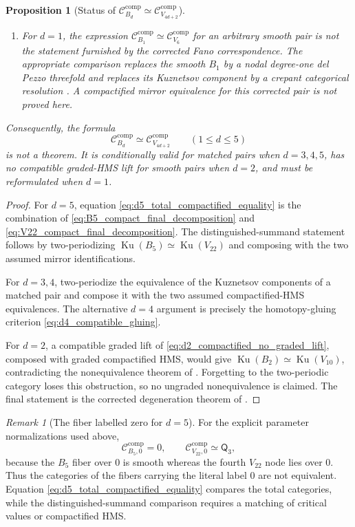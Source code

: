 \documentclass[11pt]{amsart}
\newtheorem{proposition}[theorem]{Proposition}
\theoremstyle{definition}
\theoremstyle{remark}
\newtheorem{remark}[theorem]{Remark}
\newcommand{\MorseCat}[1]{\mathsf{Q}_{#1}}
\begin{document}
\begin{proposition}[Status of
$\mathcal C_{B_d}^{\mathrm{comp}}\simeq
\mathcal C_{V_{4d+2}}^{\mathrm{comp}}$]
\begin{enumerate}[label=\textup{(\roman*)}]
\item For $d=1$, the expression
$\mathcal C_{B_1}^{\mathrm{comp}}\simeq
\mathcal C_{V_6}^{\mathrm{comp}}$ for an arbitrary smooth pair is not the
statement furnished by the corrected Fano correspondence.  The appropriate
comparison replaces the smooth $B_1$ by a nodal degree-one del Pezzo
threefold and replaces its Kuznetsov component by a crepant categorical
resolution \cite{KuzShinder}.  A compactified mirror equivalence for this
corrected pair is not proved here.
\end{enumerate}
Consequently, the formula
\[
\mathcal C_{B_d}^{\mathrm{comp}}
\simeq
\mathcal C_{V_{4d+2}}^{\mathrm{comp}}
\qquad(1\leq d\leq5)
\]
is not a theorem.  It is conditionally valid for matched pairs when
$d=3,4,5$, has no compatible graded-HMS lift for smooth pairs when $d=2$,
and must be reformulated when $d=1$.
\end{proposition}

\begin{proof}
For $d=5$, equation \eqref{eq:d5_total_compactified_equality} is the
combination of \eqref{eq:B5_compact_final_decomposition} and
\eqref{eq:V22_compact_final_decomposition}.  The distinguished-summand
statement follows by two-periodizing
$\operatorname{Ku}(B_5)\simeq\operatorname{Ku}(V_{22})$ and composing with
the two assumed mirror identifications.

For $d=3,4$, two-periodize the equivalence of the Kuznetsov components of a
matched pair and compose it with the two assumed compactified-HMS
equivalences.  The alternative $d=4$ argument is precisely the homotopy-gluing
criterion \eqref{eq:d4_compatible_gluing}.

For $d=2$, a compatible graded lift of
\eqref{eq:d2_compactified_no_graded_lift}, composed with graded compactified
HMS, would give
$\operatorname{Ku}(B_2)\simeq\operatorname{Ku}(V_{10})$, contradicting the
nonequivalence theorem of \cite{BayerPerry}.  Forgetting to the two-periodic
category loses this obstruction, so no ungraded nonequivalence is claimed.
The final statement is the corrected degeneration theorem of
\cite{KuzShinder}.
\end{proof}

\begin{remark}[The fiber labelled zero for $d=5$]
\label{rem:d5_zero_fiber_warning}
For the explicit parameter normalizations used above,
\[
\mathcal C_{B_5,0}^{\mathrm{comp}}=0,
\qquad
\mathcal C_{V_{22},0}^{\mathrm{comp}}\simeq\MorseCat{3},
\]
because the $B_5$ fiber over $0$ is smooth whereas the fourth $V_{22}$ node
lies over $0$.  Thus the categories of the fibers carrying the literal label
$0$ are not equivalent.  Equation \eqref{eq:d5_total_compactified_equality}
compares the total categories, while the distinguished-summand comparison
requires a matching of critical values or compactified HMS.
\end{remark}
\end{document}
